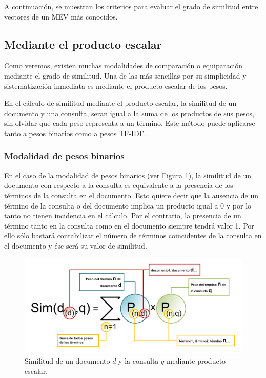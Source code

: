 \documentclass[titlepage]{article}
\begin{document}
A continuación, se muestran los criterios para evaluar el grado de similitud entre vectores de un MEV más conocidos.

\subsection{Mediante el producto escalar}

Como veremos, existen muchas modalidades de comparación o equiparación mediante el grado de similitud. Una de las más sencillas por su simplicidad y sistematización inmediata es mediante el producto escalar de los pesos.

En el cálculo de similitud mediante el producto escalar, la similitud de un documento y una consulta, seran igual a la suma de los productos de sus pesos, sin olvidar que cada peso representa a un término. Este método puede aplicarse tanto a pesos binarios como a pesos TF-IDF.

\subsubsection{Modalidad de pesos binarios}

En el caso de la modalidad de pesos binarios (ver Figura \ref{fig: Figure 1}), la similitud de un documento con respecto a la consulta es equivalente a la presencia de los términos de la consulta en el documento. Esto quiere decir que la ausencia de un término de la consulta o del documento implica un producto igual a 0 y por lo tanto no tienen incidencia en el cálculo. Por el contrario, la presencia de un término tanto en la consulta como en el documento siempre tendrá valor 1. Por ello sólo bastará contabilizar el número de términos coincidentes de la consulta en el documento y ése será su valor de similitud.

\begin{figure}[h]
	\begin{center}
		\includegraphics*[scale=0.7]{similitud_producto_escalar.png}
	\end{center}
	\caption{Similitud de un documento $d$ y la consulta $q$ mediante producto escalar.}
	\label{fig: Figure 1}
\end{figure}
\end{document}

